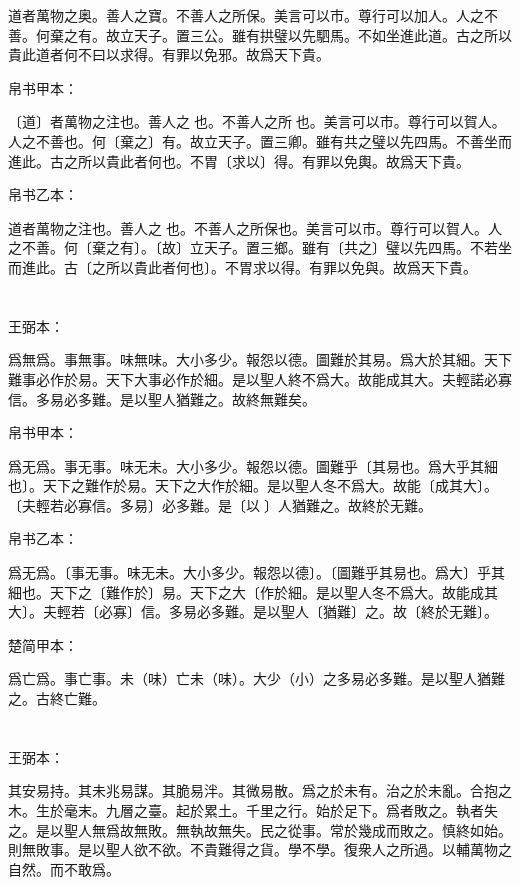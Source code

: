 \documentclass[a5paper]{ctexbook}
\begin{document}
    道者萬物之奥。善人之寶。不善人之所保。美言可以市。尊行可以加人。人之不善。何棄之有。故立天子。置三公。雖有拱璧以先駟馬。不如坐進此道。古之所以貴此道者何不曰以求得。有罪以免邪。故爲天下貴。

    
    帛书甲本：

    〔道〕者萬物之注也。善人之󱀘也。不善人之所󱀘也。美言可以市。尊行可以賀人。人之不善也。何〔棄之〕有。故立天子。置三卿。雖有共之璧以先四馬。不善坐而進此。古之所以貴此者何也。不胃〔求以〕得。有罪以免輿。故爲天下貴。

    帛书乙本：

    道者萬物之注也。善人之󱀘也。不善人之所保也。美言可以市。尊行可以賀人。人之不善。何〔棄之有〕。〔故〕立天子。置三鄉。雖有〔共之〕璧以先四馬。不若坐而進此。古〔之所以貴此者何也〕。不胃求以得。有罪以免與。故爲天下貴。

    \chapter{}
    王弼本：

    爲無爲。事無事。味無味。大小多少。報怨以德。圖難於其易。爲大於其細。天下難事必作於易。天下大事必作於細。是以聖人終不爲大。故能成其大。夫輕諾必寡信。多易必多難。是以聖人猶難之。故終無難矣。

    
    帛书甲本：

    爲无爲。事无事。味无未。大小多少。報怨以德。圖難乎〔其易也。爲大乎其細也〕。天下之難作於易。天下之大作於細。是以聖人冬不爲大。故能〔成其大〕。〔夫輕若必寡信。多易〕必多難。是〔以𦔻〕人猶難之。故終於无難。

    帛书乙本：

    爲无爲。〔事无事。味无未。大小多少。報怨以德〕。〔圖難乎其易也。爲大〕乎其細也。天下之〔難作於〕易。天下之大〔作於細。是以聖人冬不爲大。故能成其大〕。夫輕若〔必寡〕信。多易必多難。是以聖人〔猶難〕之。故〔終於无難〕。

    楚简甲本：

    爲亡爲。事亡事。未（味）亡未（味）。大少（小）之多易必多難。是以聖人猶難之。古終亡難。

    \chapter{}
    王弼本：

    其安易持。其未兆易謀。其脆易泮。其微易散。爲之於未有。治之於未亂。合抱之木。生於毫末。九層之臺。起於累土。千里之行。始於足下。爲者敗之。執者失之。是以聖人無爲故無敗。無執故無失。民之從事。常於幾成而敗之。慎終如始。則無敗事。是以聖人欲不欲。不貴難得之貨。學不學。復衆人之所過。以輔萬物之自然。而不敢爲。
\end{document}
